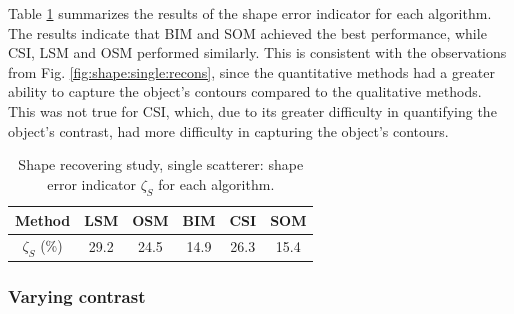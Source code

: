 \documentclass{IEEEtran}
\begin{document}
                Table \ref{tab:star} summarizes the results of the shape error indicator for each algorithm. The results indicate that BIM and SOM achieved the best performance, while CSI, LSM and OSM performed similarly. This is consistent with the observations from Fig. \ref{fig:shape:single:recons}, since the quantitative methods had a greater ability to capture the object's contours compared to the qualitative methods. This was not true for CSI, which, due to its greater difficulty in quantifying the object's contrast, had more difficulty in capturing the object's contours.           

                \begin{table}[!htb]
                    \centering
                    \renewcommand{\arraystretch}{1.5}
                    \caption{Shape recovering study, single scatterer: shape error indicator $\zeta_S$ for each algorithm.}
                    \label{tab:star}
                    \begin{tabular}{cccccc}
                        Method & LSM & OSM & BIM & CSI & SOM \\\hline
                        $\zeta_S$ (\%) & 29.2 & 24.5 & 14.9 & 26.3 & 15.4 \\
                    \end{tabular}   
                \end{table}
			
			\subsubsection{Varying contrast}\label{sec:results:shape:varying}

\end{document}
